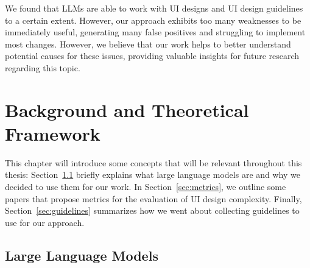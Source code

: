 \documentclass[11pt,titlepage,oneside,openany]{book}
\begin{document}
We found that LLMs are able to work with UI designs and UI design guidelines to a certain extent. However, our approach exhibits too many weaknesses to be immediately useful, generating many false positives and struggling to implement most changes. However, we believe that our work helps to better understand potential causes for these issues, providing valuable insights for future research regarding this topic.

\chapter{Background and Theoretical Framework}

This chapter will introduce some concepts that will be relevant throughout this thesis: Section~\ref{sec:llms} briefly explains what large language models are and why we decided to use them for our work. In Section~\ref{sec:metrics}, we outline some papers that propose metrics for the evaluation of UI design complexity. Finally, Section~\ref{sec:guidelines} summarizes how we went about collecting guidelines to use for our approach.

\section{Large Language Models}\label{sec:llms}
\end{document}
